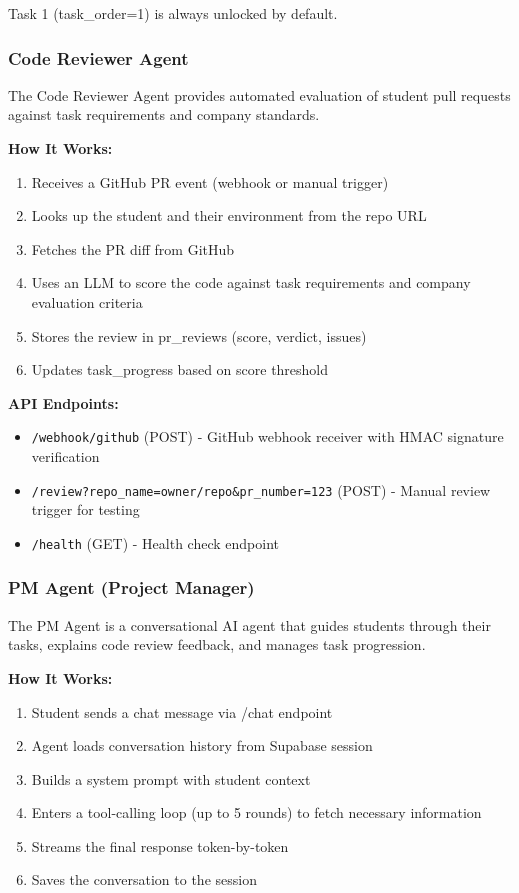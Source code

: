 \documentclass[12pt,a4paper]{report}
\begin{document}
Task 1 (task\_order=1) is always unlocked by default.

\subsubsection{Code Reviewer Agent}

The Code Reviewer Agent provides automated evaluation of student pull requests against task requirements and company standards.

\textbf{How It Works:}
\begin{enumerate}
    \item Receives a GitHub PR event (webhook or manual trigger)
    \item Looks up the student and their environment from the repo URL
    \item Fetches the PR diff from GitHub
    \item Uses an LLM to score the code against task requirements and company evaluation criteria
    \item Stores the review in pr\_reviews (score, verdict, issues)
    \item Updates task\_progress based on score threshold
\end{enumerate}

\textbf{API Endpoints:}
\begin{itemize}
    \item \texttt{/webhook/github} (POST) - GitHub webhook receiver with HMAC signature verification
    \item \texttt{/review?repo\_name=owner/repo\&pr\_number=123} (POST) - Manual review trigger for testing
    \item \texttt{/health} (GET) - Health check endpoint
\end{itemize}

\subsubsection{PM Agent (Project Manager)}

The PM Agent is a conversational AI agent that guides students through their tasks, explains code review feedback, and manages task progression.

\textbf{How It Works:}
\begin{enumerate}
    \item Student sends a chat message via /chat endpoint
    \item Agent loads conversation history from Supabase session
    \item Builds a system prompt with student context
    \item Enters a tool-calling loop (up to 5 rounds) to fetch necessary information
    \item Streams the final response token-by-token
    \item Saves the conversation to the session
\end{enumerate}
\end{document}

